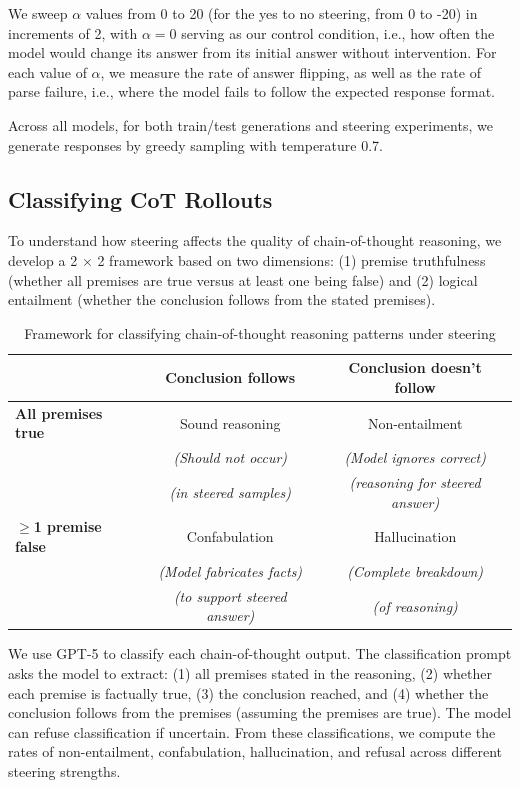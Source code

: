 \documentclass{article}
\begin{document}
We sweep $\alpha$ values from 0 to 20 (for the yes to no steering, from 0 to -20) in increments of 2, with $\alpha = 0$ serving as our control condition, i.e., how often the model would change its answer from its initial answer without intervention. For each value of $\alpha$, we measure the rate of answer flipping, as well as the rate of parse failure, i.e., where the model fails to follow the expected response format.

Across all models, for both train/test generations and steering experiments, we generate responses by greedy sampling with temperature 0.7.

\subsection{Classifying CoT Rollouts}

To understand how steering affects the quality of chain-of-thought reasoning, we develop a 2 $\times$ 2 framework based on two dimensions: (1) premise truthfulness (whether all premises are true versus at least one being false) and (2) logical entailment (whether the conclusion follows from the stated premises).

\begin{table}[h]
\centering
\caption{Framework for classifying chain-of-thought reasoning patterns under steering}
\label{tab:reasoning-framework}
\scriptsize
\begin{tabular}{l|cc}
\toprule
& \textbf{Conclusion follows} & \textbf{Conclusion doesn't follow} \\
\midrule
\textbf{All premises true} & Sound reasoning & Non-entailment \\
& \textit{(Should not occur)} & \textit{(Model ignores correct)} \\
& \textit{(in steered samples)} & \textit{(reasoning for steered answer)} \\
\midrule
\textbf{$\geq$1 premise false} & Confabulation & Hallucination \\
& \textit{(Model fabricates facts)} & \textit{(Complete breakdown)} \\
& \textit{(to support steered answer)} & \textit{(of reasoning)} \\
\bottomrule
\end{tabular}
\end{table}

We use GPT-5 to classify each chain-of-thought output. The classification prompt asks the model to extract: (1) all premises stated in the reasoning, (2) whether each premise is factually true, (3) the conclusion reached, and (4) whether the conclusion follows from the premises (assuming the premises are true). The model can refuse classification if uncertain. From these classifications, we compute the rates of non-entailment, confabulation, hallucination, and refusal across different steering strengths.
\end{document}
